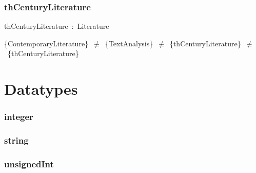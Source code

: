 \documentclass{article}
\begin{document}
\subsubsection*{thCenturyLiterature}

thCenturyLiterature~:~Literature

\{ContemporaryLiterature\}~\ensuremath{\not\equiv}~\{TextAnalysis\}~\ensuremath{\not\equiv}~\{thCenturyLiterature\}~\ensuremath{\not\equiv}~\{thCenturyLiterature\}

\section*{Datatypes}\subsubsection*{integer}

\subsubsection*{string}

\subsubsection*{unsignedInt}
\end{document}
